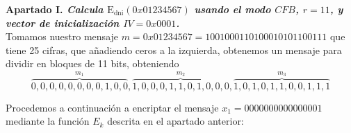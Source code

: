 \documentclass[fleqn]{article}
\begin{document}



    \newpage
    \textbf{Apartado I. \textit{Calcula $\text{E}_{\text{dni}}(0x01234567)$ usando el modo $CFB$, $r=11$, y vector de 
            inicialización $IV = 0x0001$.}}\\

    Tomamos nuestro mensaje $m = 0x01234567 = 1001000110100010101100111$ que tiene 25 cifras, que añadiendo ceros a la izquierda,
    obtenemos un mensaje para dividir en bloques de 11 bits, obteniendo
    $$\overbrace{0,0,0,0,0,0,0,0,1,0,0}^{m_1},\overbrace{1,0,0,0,1,1,0,1,0,0,0}^{m_2},\overbrace{1,0,1,0,1,1,0,0,1,1,1}^{m_3} $$

    Procedemos a continuación a encriptar el mensaje $x_1 = 0000000000000001$ mediante la función $E_k$ descrita en el apartado anterior:
\end{document}
